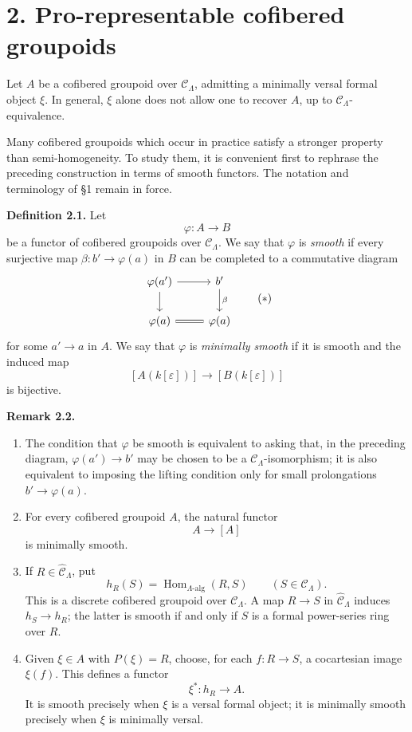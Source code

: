 \documentclass[11pt]{article}
\providecommand{\Hom}{\operatorname{Hom}}
\begin{document}
\section*{2. Pro-representable cofibered groupoids}

Let \(A\) be a cofibered groupoid over \(\mathcal C_\Lambda\), admitting a minimally
versal formal object \(\xi\). In general, \(\xi\) alone does not allow one to recover
\(A\), up to \(\mathcal C_\Lambda\)-equivalence.

Many cofibered groupoids which occur in practice satisfy a stronger property than
semi-homogeneity. To study them, it is convenient first to rephrase the preceding
construction in terms of smooth functors. The notation and terminology of §1 remain
in force.

\textbf{Definition 2.1.} Let
\[
 \varphi:A\longrightarrow B
\]
be a functor of cofibered groupoids over \(\mathcal C_\Lambda\). We say that
\(\varphi\) is \emph{smooth} if every surjective map
\(\beta:b'\to\varphi(a)\) in \(B\) can be completed to a commutative diagram
\[
\begin{tikzcd}
\varphi(a') \arrow[r] \arrow[d] & b' \arrow[d,"\beta"]\\
\varphi(a) \arrow[r,equal] & \varphi(a)
\end{tikzcd}
\tag{\(*\)}
\]
for some \(a'\to a\) in \(A\). We say that \(\varphi\) is \emph{minimally smooth}
if it is smooth and the induced map
\[
 [A(k[\varepsilon])]\longrightarrow [B(k[\varepsilon])]
\]
is bijective.

\textbf{Remark 2.2.}
\begin{enumerate}[label=(\alph*)]
\item The condition that \(\varphi\) be smooth is equivalent to asking that, in the preceding
diagram, \(\varphi(a')\to b'\) may be chosen to be a \(\mathcal C_\Lambda\)-isomorphism; it is
also equivalent to imposing the lifting condition only for small prolongations
\(b'\to\varphi(a)\).

\item For every cofibered groupoid \(A\), the natural functor
\[
 A\longrightarrow [A]
\]
is minimally smooth.

\item If \(R\in\widehat{\mathcal C}_\Lambda\), put
\[
 h_R(S)=\Hom_{\Lambda\text{-}\mathrm{alg}}(R,S)\qquad(S\in\mathcal C_\Lambda).
\]
This is a discrete cofibered groupoid over \(\mathcal C_\Lambda\). A map \(R\to S\) in
\(\widehat{\mathcal C}_\Lambda\) induces \(h_S\to h_R\); the latter is smooth if and
only if \(S\) is a formal power-series ring over \(R\).

\item Given \(\xi\in A\) with \(P(\xi)=R\), choose, for each \(f:R\to S\), a cocartesian
image \(\xi(f)\). This defines a functor
\[
 \xi^\ast:h_R\longrightarrow A.
\]
It is smooth precisely when \(\xi\) is a versal formal object; it is minimally smooth
precisely when \(\xi\) is minimally versal.
\end{enumerate}
\end{document}

